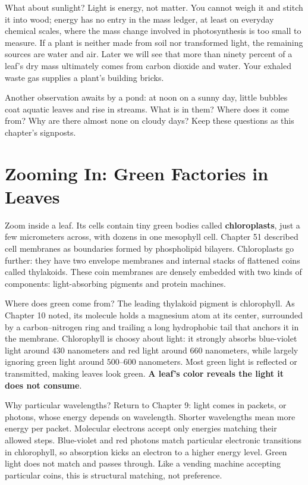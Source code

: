 What about sunlight? Light is energy, not matter. You cannot weigh it and stitch it into wood; energy has no entry in the mass ledger, at least on everyday chemical scales, where the mass change involved in photosynthesis is too small to measure. If a plant is neither made from soil nor transformed light, the remaining sources are water and air. Later we will see that more than ninety percent of a leaf's dry mass ultimately comes from carbon dioxide and water. Your exhaled waste gas supplies a plant's building bricks.

Another observation awaits by a pond: at noon on a sunny day, little bubbles coat aquatic leaves and rise in streams. What is in them? Where does it come from? Why are there almost none on cloudy days? Keep these questions as this chapter's signposts.

\section{Zooming In: Green Factories in Leaves}

Zoom inside a leaf. Its cells contain tiny green bodies called \textbf{chloroplasts}, just a few micrometers across, with dozens in one mesophyll cell. Chapter 51 described cell membranes as boundaries formed by phospholipid bilayers. Chloroplasts go further: they have two envelope membranes and internal stacks of flattened coins called thylakoids. These coin membranes are densely embedded with two kinds of components: light-absorbing pigments and protein machines.

Where does green come from? The leading thylakoid pigment is chlorophyll. As Chapter 10 noted, its molecule holds a magnesium atom at its center, surrounded by a carbon--nitrogen ring and trailing a long hydrophobic tail that anchors it in the membrane. Chlorophyll is choosy about light: it strongly absorbs blue-violet light around $430$ nanometers and red light around $660$ nanometers, while largely ignoring green light around $500$--$600$ nanometers. Most green light is reflected or transmitted, making leaves look green. \textbf{A leaf's color reveals the light it does not consume}.

Why particular wavelengths? Return to Chapter 9: light comes in packets, or photons, whose energy depends on wavelength. Shorter wavelengths mean more energy per packet. Molecular electrons accept only energies matching their allowed steps. Blue-violet and red photons match particular electronic transitions in chlorophyll, so absorption kicks an electron to a higher energy level. Green light does not match and passes through. Like a vending machine accepting particular coins, this is structural matching, not preference.

